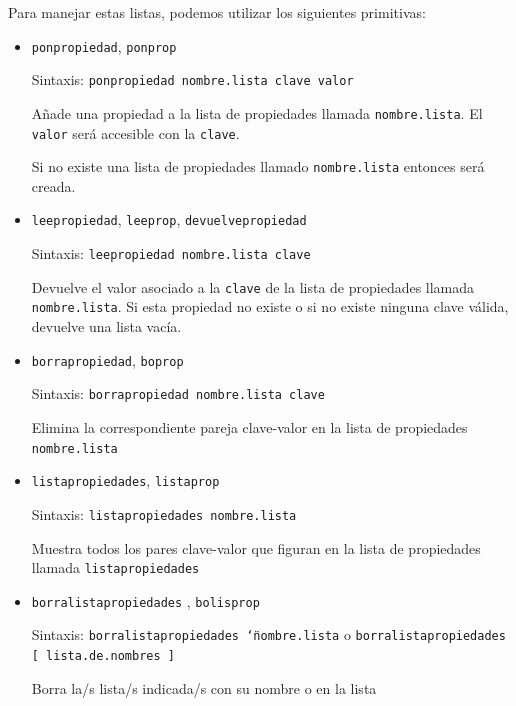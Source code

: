 Para manejar estas listas, podemos utilizar los siguientes primitivas:
\begin{itemize}
   \item \texttt{ponpropiedad},
         \texttt{ponprop}

      Sintaxis: \texttt{ponpropiedad nombre.lista clave valor}

      A\~nade una propiedad a la lista de propiedades llamada
      \texttt{nombre.lista}. El \texttt{valor} ser\'a accesible con la
      \texttt{clave}.

      Si no existe una lista de propiedades llamado \texttt{nombre.lista} 
      entonces ser\'a creada.
   \item \texttt{leepropiedad}, 
         \texttt{leeprop},
      \texttt{devuelvepropiedad}

      Sintaxis: \texttt{leepropiedad nombre.lista clave} 

      Devuelve el valor asociado a la \texttt{clave} de la lista de propiedades
      llamada \texttt{nombre.lista}. Si esta propiedad no existe o si no existe
      ninguna clave v\'alida, devuelve una lista vac\'ia.
   \item \texttt{borrapropiedad},
         \texttt{boprop}

       Sintaxis: \texttt{borrapropiedad nombre.lista clave}

       Elimina la correspondiente pareja clave-valor en la lista de propiedades
       \texttt{nombre.lista}
   \item \texttt{listapropiedades},
        \texttt{listaprop}

      Sintaxis: \texttt{listapropiedades nombre.lista}

      Muestra todos los pares clave-valor que figuran en la lista de propiedades
      llamada \texttt{listapropiedades}
   \item \texttt{borralistapropiedades}%
      ,
        \texttt{bolisprop}

      Sintaxis: \texttt{borralistapropiedades \char`\"{}nombre.lista} o
          \texttt{borralistapropiedades [ lista.de.nombres ]}

      Borra la/s lista/s indicada/s con su nombre o en la lista
\end{itemize}
